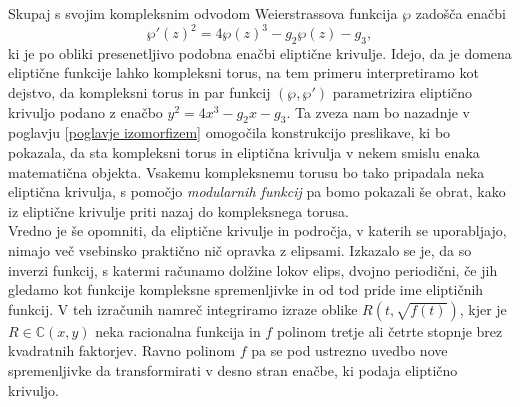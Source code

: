 \documentclass[mat1]{fmfdelo}
\numberwithin{equation}{section}
\newcommand{\C}{\mathbb C}
\theoremstyle{definition}
\begin{document}
Skupaj s svojim kompleksnim odvodom Weierstrassova funkcija $\wp$ zadošča enačbi
\[
  \wp'(z)^2 = 4\wp(z)^3 - g_2\wp(z) - g_3,  
\] 
ki je po obliki presenetljivo podobna enačbi eliptične krivulje. Idejo, da je domena eliptične funkcije lahko kompleksni torus, na tem primeru interpretiramo kot dejstvo, da kompleksni torus in par funkcij $(\wp, \wp')$ parametrizira eliptično krivuljo podano z enačbo $y^2 = 4x^3 - g_2x - g_3$.
Ta zveza nam bo nazadnje v poglavju \ref{poglavje izomorfizem} omogočila konstrukcijo preslikave, ki bo pokazala, da sta kompleksni torus in eliptična krivulja v nekem smislu enaka matematična objekta. Vsakemu kompleksnemu torusu bo tako pripadala neka eliptična krivulja, s pomočjo \emph{modularnih funkcij} pa bomo pokazali še obrat, kako iz eliptične krivulje priti nazaj do kompleksnega torusa. 
\\

Vredno je še opomniti, da eliptične krivulje in področja, v katerih se uporabljajo,
nimajo več vsebinsko praktično nič opravka z elipsami. 
Izkazalo se je, da so inverzi funkcij, s katermi računamo dolžine lokov elips, dvojno periodični,
če jih gledamo kot funkcije kompleksne spremenljivke in od tod pride ime eliptičnih funkcij. V teh izračunih namreč integriramo izraze oblike $R(t, \sqrt{f(t)})$, kjer je $R \in \C(x,y)$ neka racionalna funkcija in $f$ polinom tretje ali četrte stopnje brez kvadratnih faktorjev. Ravno polinom $f$ pa se pod ustrezno uvedbo nove spremenljivke da transformirati v desno stran enačbe, ki podaja eliptično krivuljo. 

\end{document}
